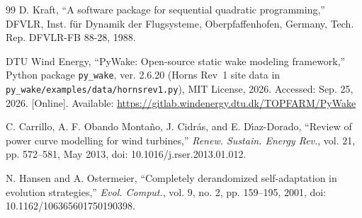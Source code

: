 {\begin{thebibliography}{99}
D. Kraft, ``A software package for sequential quadratic programming,'' DFVLR, Inst. f\"ur Dynamik der Flugsysteme, Oberpfaffenhofen, Germany, Tech. Rep. DFVLR-FB 88-28, 1988.

DTU Wind Energy, ``PyWake: Open-source static wake modeling framework,'' Python package \texttt{py\_wake}, ver. 2.6.20 (Horns Rev~1 site data in \texttt{py\_wake/examples/data/hornsrev1.py}), MIT License, 2026. Accessed: Sep. 25, 2026. [Online]. Available: \url{https://gitlab.windenergy.dtu.dk/TOPFARM/PyWake}

C. Carrillo, A. F. Obando Monta\~no, J. Cidr\'as, and E. D\'{\i}az-Dorado, ``Review of power curve modelling for wind turbines,'' \textit{Renew. Sustain. Energy Rev.}, vol. 21, pp. 572--581, May 2013, doi: 10.1016/j.rser.2013.01.012.

N. Hansen and A. Ostermeier, ``Completely derandomized self-adaptation in evolution strategies,'' \textit{Evol. Comput.}, vol. 9, no. 2, pp. 159--195, 2001, doi: 10.1162/106365601750190398.

\end{thebibliography}
}
